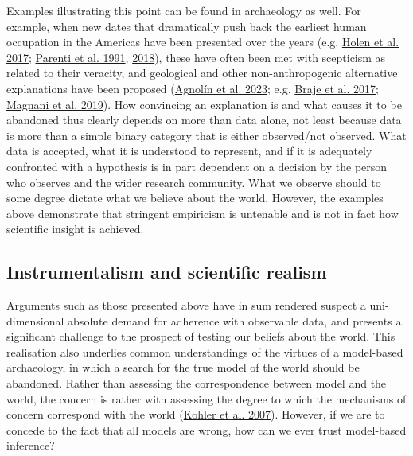 \documentclass[
  a4paper,
  oneside]{uiophdthesis}
\begin{document}
Examples illustrating this point can be found in archaeology as well. For example, when new dates that dramatically push back the earliest human occupation in the Americas have been presented over the years (e.g. \protect\hyperlink{ref-holen2017}{Holen et al. 2017}; \protect\hyperlink{ref-parenti1991}{Parenti et al. 1991}, \protect\hyperlink{ref-parenti2018}{2018}), these have often been met with scepticism as related to their veracity, and geological and other non-anthropogenic alternative explanations have been proposed (\protect\hyperlink{ref-agnolin2023}{Agnolín et al. 2023}; e.g. \protect\hyperlink{ref-braje2017}{Braje et al. 2017}; \protect\hyperlink{ref-magnani2019}{Magnani et al. 2019}). How convincing an explanation is and what causes it to be abandoned thus clearly depends on more than data alone, not least because data is more than a simple binary category that is either observed/not observed. What data is accepted, what it is understood to represent, and if it is adequately confronted with a hypothesis is in part dependent on a decision by the person who observes and the wider research community. What we observe should to some degree dictate what we believe about the world. However, the examples above demonstrate that stringent empiricism is untenable and is not in fact how scientific insight is achieved.

\hypertarget{instrumentalism-and-scientific-realism}{%
\subsection{Instrumentalism and scientific realism}\label{instrumentalism-and-scientific-realism}}

Arguments such as those presented above have in sum rendered suspect a uni-dimensional absolute demand for adherence with observable data, and presents a significant challenge to the prospect of testing our beliefs about the world. This realisation also underlies common understandings of the virtues of a model-based archaeology, in which a search for the true model of the world should be abandoned. Rather than assessing the correspondence between model and the world, the concern is rather with assessing the degree to which the mechanisms of concern correspond with the world (\protect\hyperlink{ref-kohler2007}{Kohler et al. 2007}). However, if we are to concede to the fact that all models are wrong, how can we ever trust model-based inference?
\end{document}
